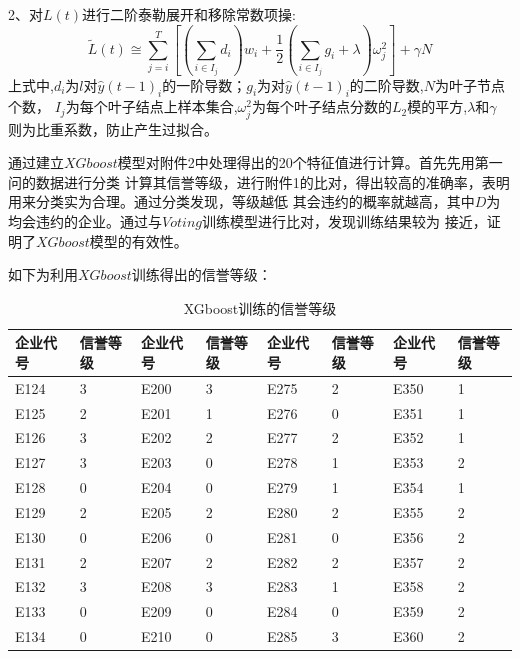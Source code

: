 \documentclass[UTF8]{ctexart}
\begin{document}
2、对$L(t)$进行二阶泰勒展开和移除常数项操:
\begin{equation}
	\tilde{L}(t) \cong \sum_{j=i}^T[(\sum_{i\in I_j}d_i)w_i+\frac{1}{2}(\sum_{i\in I_j}g_i+\lambda )\omega ^2_j]+\gamma N
\end{equation}
上式中,$d_i$为$l$对$\hat{y}(t-1)_i$的一阶导数；$g_i$为对$\hat{y}(t-1)_i$的二阶导数,$N$为叶子节点个数，
$I_j$为每个叶子结点上样本集合,$\omega ^2_j$为每个叶子结点分数的$L_2$模的平方,$\lambda$和$\gamma$
则为比重系数，防止产生过拟合。

通过建立$XGboost$模型对附件2中处理得出的20个特征值进行计算。首先先用第一问的数据进行分类
计算其信誉等级，进行附件1的比对，得出较高的准确率，表明用来分类实为合理。通过分类发现，等级越低
其会违约的概率就越高，其中$D$为均会违约的企业。通过与$Voting$训练模型进行比对，发现训练结果较为
接近，证明了$XGboost$模型的有效性。

如下为利用$XGboost$训练得出的信誉等级：
\begin{table}[H]
	\centering
	\caption{XGboost训练的信誉等级}
	\begin{tabular}{|l|l|l|l|l|l|l|l|}
		\hline
		企业代号 & 信誉等级 & 企业代号 & 信誉等级 & 企业代号 & 信誉等级 & 企业代号 & 信誉等级 \\ \hline
		E124     & 3        & E200     & 3        & E275     & 2        & E350     & 1        \\ \hline
		E125     & 2        & E201     & 1        & E276     & 0        & E351     & 1        \\ \hline
		E126     & 3        & E202     & 2        & E277     & 2        & E352     & 1        \\ \hline
		E127     & 3        & E203     & 0        & E278     & 1        & E353     & 2        \\ \hline
		E128     & 0        & E204     & 0        & E279     & 1        & E354     & 1        \\ \hline
		E129     & 2        & E205     & 2        & E280     & 2        & E355     & 2        \\ \hline
		E130     & 0        & E206     & 0        & E281     & 0        & E356     & 2        \\ \hline
		E131     & 2        & E207     & 2        & E282     & 2        & E357     & 2        \\ \hline
		E132     & 3        & E208     & 3        & E283     & 1        & E358     & 2        \\ \hline
		E133     & 0        & E209     & 0        & E284     & 0        & E359     & 2        \\ \hline
		E134     & 0        & E210     & 0        & E285     & 3        & E360     & 2        \\ \hline
	\end{tabular}
\end{table}
\end{document}
